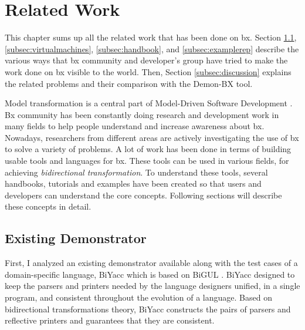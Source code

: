 \section{Related Work}\label{sec:relatedwork}
This chapter sums up all the related work that has been done on bx. Section \ref{subsec:existingdemo}, \ref{subsec:virtualmachines}, \ref{subsec:handbook}, and \ref{subsec:examplerep} describe the various ways that bx community and developer's group have tried to make the work done on bx visible to the world. Then, Section \ref{subsec:discussion} explains the related problems and their comparison with the Demon-BX tool. 

Model transformation is a central part of Model-Driven Software Development \cite{bx-grace} \cite{bx-dagstuhl}. Bx community has been constantly doing research and development work in many fields to help people understand and increase awareness about bx. Nowadays, researchers from different areas are actively investigating the use of bx to solve a variety of problems. A lot of work has been done in terms of building usable tools and languages for bx. These tools can be used in various fields, for achieving \textit{bidirectional transformation}. To understand these tools, several handbooks, tutorials and examples have been created so that users and developers can understand the core concepts. Following sections will describe these concepts in detail.

\subsection{Existing Demonstrator}\label{subsec:existingdemo}
First, I analyzed an existing demonstrator available along with the test cases of a domain-specific language, BiYacc \cite{biyacc} which is based on BiGUL \cite{bigul}. BiYacc designed to keep the parsers and printers needed by the language designers unified, in a single program, and consistent throughout the evolution of a language. Based on bidirectional transformations theory, BiYacc constructs the pairs of parsers and reflective printers and guarantees that they are consistent.

